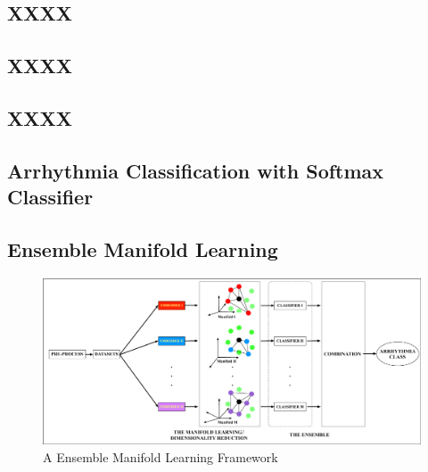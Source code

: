\documentclass[journal]{IEEEtran}
\begin{document}
%
%
\subsection{XXXX}

%
%
\subsection{XXXX}

%
%
\subsection{XXXX}



%
%
\subsection{Arrhythmia Classification with Softmax Classifier}



%
%

\subsection{Ensemble Manifold Learning}

\begin{figure}[!t]
\includegraphics[width=7in]{EPS/systemStructure.eps}
\caption{A Ensemble Manifold Learning Framework}
\end{figure}
\end{document}
